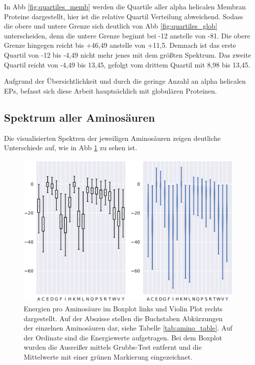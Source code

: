 In \ac{Abb} \ref{fig:quartiles_memb} werden die Quartile aller alpha helicalen Membran Proteine dargestellt, hier ist die relative Quartil Verteilung abweichend. Sodass die obere und untere Grenze sich deutlich von \ac{Abb} \ref{fig:quartiles_glob} unterscheiden, denn die untere Grenze beginnt bei -12 anstelle von -81. Die obere Grenze hingegen reicht bis +46,49 anstelle von +11,5. Demnach ist das erste Quartil von -12 bis -4,49 nicht mehr jenes mit dem größten Spektrum. Das zweite Quartil reicht von -4,49 bis 13,45, gefolgt vom drittem Quartil mit 8,98 bis 13,45.

Aufgrund der Übersichtlichkeit und durch die geringe Anzahl an alpha helicalen \ac{EP}s, befasst sich diese Arbeit hauptsächlich mit globulären Proteinen. 


\subsection{Spektrum aller Aminosäuren}

Die visualisierten Spektren der jeweiligen Aminosäuren zeigen deutliche Unterschiede auf, wie in \ac{Abb} \ref{fig:energy_ranges} zu sehen ist.

\begin{figure}
    \centering
    \includegraphics[width=.99\textwidth]{images/BoxPlot_energy_rages.png}
    \caption{Energien pro Aminosäure im Boxplot links und Violin Plot rechts dargestellt. Auf der Abszisse stellen die Buchstaben Abkürzungen der einzelnen Aminosäuren dar, siehe Tabelle \ref{tab:amino_table}. Auf der Ordinate sind die Energiewerte aufgetragen. Bei dem Boxplot wurden die Ausreißer mittels Grubbs-Test entfernt und die Mittelwerte mit einer grünen Markierung eingezeichnet.}
    \label{fig:energy_ranges}
\end{figure}


